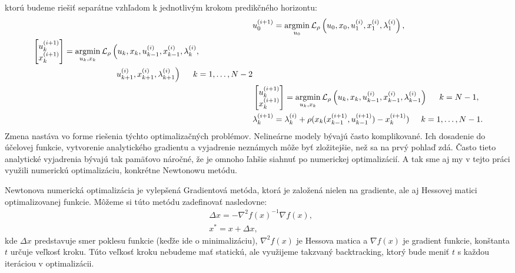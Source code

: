 ktorú budeme riešiť separátne vzhľadom k jednotlivým krokom predikčného horizontu:
\begin{subequations}
\begin{align}
	&u_{0}^{(i+1)} = \argmin_{u_{0}} \mathcal{L}_{\rho} \left(u_0,x_{0},u_1^{(i)},x_{1}^{(i)},\lambda_{1}^{(i)}\right),\\
	\begin{split}
		&\begin{bmatrix}
		u_{k}^{(i+1)} \\
		x_{k}^{(i+1)}
		\end{bmatrix} = 
		\argmin_{u_{k},x_{k}} \mathcal{L}_{\rho} \left(u_{k},x_{k},u_{k-1}^{(i)},x_{k-1}^{(i)},\lambda_{k}^{(i)},\right.\\
		&\left.\hspace{3.5cm}u_{k+1}^{(i)},x_{k+1}^{(i)},\lambda_{k+1}^{(i)}\right) \hspace{0.5cm} k=1,\dots,N-2
	\end{split}\\
	&\begin{bmatrix}
		u_{k}^{(i+1)} \\
		x_{k}^{(i+1)}
	\end{bmatrix} = \argmin_{u_{k},x_{k}} \mathcal{L}_{\rho} \left(u_{k},x_{k},u_{k-1}^{(i)},x_{k-1}^{(i)},\lambda_{k-1}^{(i)}\right) \hspace{0.5cm} k=N-1,\\
	&\lambda_{k}^{(i+1)} = \lambda_{k}^{(i)} + \rho( x_{k}(x_{k-1}^{(i+1)},u_{k-1}^{(i+1)}) - x_{k}^{(i+1)}) \hspace{0.5cm} k=1,\dots,N-1.
\end{align}
\end{subequations}
Zmena nastáva vo forme riešenia týchto optimalizačných problémov. 
Nelineárne modely bývajú často komplikované. Ich dosadenie do účelovej funkcie, vytvorenie analytického gradientu a vyjadrenie neznámych môže byť zložitejšie, než sa na prvý pohlaď zdá. Často tieto analytické vyjadrenia bývajú tak pamäťovo náročné, že je omnoho ľahšie siahnuť po numerickej optimalizácií. A tak sme aj my v tejto práci využili numerickú optimalizáciu, konkrétne Newtonowu metódu. 

\label{opt:Newton}
Newtonova numerická optimalizácia je vylepšená Gradientová metóda, ktorá je založená nielen na gradiente, ale aj Hessovej matici optimalizovanej funkcie. Môžeme si túto metódu zadefinovať nasledovne:
\begin{subequations}
\begin{align}
&\Delta x = -\nabla^{2}f(x)^{-1} \nabla f(x), \\
& x^{*} = x + \Delta x,
\end{align}
\end{subequations}
kde $\Delta x$ predstavuje smer poklesu funkcie (keďže ide o minimalizáciu), $\nabla^{2}f(x)$ je Hessova matica a $\nabla f(x)$ je gradient funkcie, konštanta $t$ určuje veľkosť kroku. 
Túto veľkosť kroku nebudeme mať statickú, ale využijeme takzvaný backtracking, ktorý bude meniť $t$ s každou iteráciou v optimalizácii.

